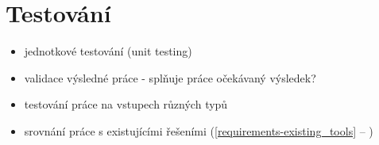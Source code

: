 \chapter{Testování}


\begin{itemize}
\item jednotkové testování (unit testing)
\item validace výsledné práce - splňuje práce očekávaný výsledek?
\item testování práce na vstupech různých typů
\item srovnání práce s existujícími řešeními (\ref{requirements-existing_tools} -- )
\end{itemize}
